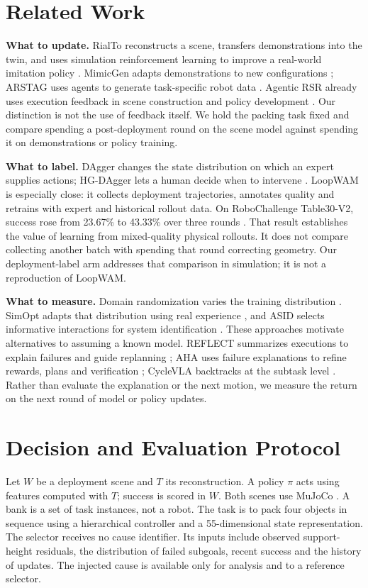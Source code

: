 \clearpage
\section{Related Work}
\textbf{What to update.} RialTo reconstructs a scene, transfers demonstrations into the twin, and uses simulation reinforcement learning to improve a real-world imitation policy \cite{rialto}. MimicGen adapts demonstrations to new configurations \cite{mandlekar2023mimicgen}; ARSTAG uses agents to generate task-specific robot data \cite{arstag}. Agentic RSR already uses execution feedback in scene construction and policy development \cite{agenticrsr}. Our distinction is not the use of feedback itself. We hold the packing task fixed and compare spending a post-deployment round on the scene model against spending it on demonstrations or policy training.

\textbf{What to label.} DAgger changes the state distribution on which an expert supplies actions; HG-DAgger lets a human decide when to intervene \cite{ross2011dagger,kelly2019hgdagger}. LoopWAM is especially close: it collects deployment trajectories, annotates quality and retrains with expert and historical rollout data. On RoboChallenge Table30-V2, success rose from 23.67\% to 43.33\% over three rounds \cite{loopwam}. That result establishes the value of learning from mixed-quality physical rollouts. It does not compare collecting another batch with spending that round correcting geometry. Our deployment-label arm addresses that comparison in simulation; it is not a reproduction of LoopWAM.

\textbf{What to measure.} Domain randomization varies the training distribution \cite{tobin2017dr}. SimOpt adapts that distribution using real experience \cite{chebotar2019asid}, and ASID selects informative interactions for system identification \cite{asid}. These approaches motivate alternatives to assuming a known model. REFLECT summarizes executions to explain failures and guide replanning \cite{reflect}; AHA uses failure explanations to refine rewards, plans and verification \cite{aha}; CycleVLA backtracks at the subtask level \cite{cyclevla}. Rather than evaluate the explanation or the next motion, we measure the return on the next round of model or policy updates.

\section{Decision and Evaluation Protocol}
Let $W$ be a deployment scene and $T$ its reconstruction. A policy $\pi$ acts using features computed with $T$; success is scored in $W$. Both scenes use MuJoCo \cite{mujoco}. A bank is a set of task instances, not a robot. The task is to pack four objects in sequence using a hierarchical controller and a 55-dimensional state representation. The selector receives no cause identifier. Its inputs include observed support-height residuals, the distribution of failed subgoals, recent success and the history of updates. The injected cause is available only for analysis and to a reference selector.


